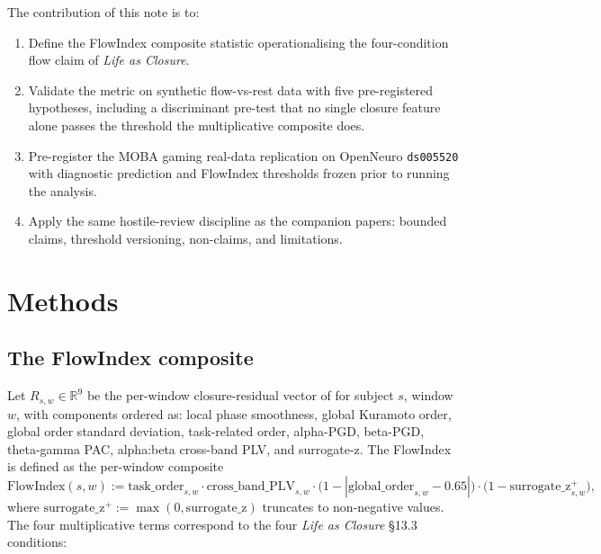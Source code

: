 \documentclass[11pt,a4paper]{article}
\begin{document}
\bigskip
\noindent{}
\bigskip

The contribution of this note is to:
\begin{enumerate}\itemsep0pt
\item Define the FlowIndex composite statistic operationalising the four-condition flow claim of \emph{Life as Closure}.
\item Validate the metric on synthetic flow-vs-rest data with five pre-registered hypotheses, including a discriminant pre-test that no single closure feature alone passes the threshold the multiplicative composite does.
\item Pre-register the MOBA gaming real-data replication on OpenNeuro \texttt{ds005520} with diagnostic prediction and FlowIndex thresholds frozen prior to running the analysis.
\item Apply the same hostile-review discipline as the companion papers: bounded claims, threshold versioning, non-claims, and limitations.
\end{enumerate}

\section{Methods}\label{sec:methods}

\subsection{The FlowIndex composite}\label{sec:methods-flowindex}

Let $R_{s,w} \in \mathbb{R}^9$ be the per-window closure-residual vector of \citep{SolutionLab002} for subject $s$, window $w$, with components ordered as: local phase smoothness, global Kuramoto order, global order standard deviation, task-related order, alpha-PGD, beta-PGD, theta-gamma PAC, alpha:beta cross-band PLV, and surrogate-z. The FlowIndex is defined as the per-window composite
\[
  \mathrm{FlowIndex}(s,w) := \mathrm{task\_order}_{s,w} \cdot \mathrm{cross\_band\_PLV}_{s,w} \cdot \big(1 - |\mathrm{global\_order}_{s,w} - 0.65|\big) \cdot \big(1 - \mathrm{surrogate\_z}_{s,w}^+\big),
\]
where $\mathrm{surrogate\_z}^+ := \max(0, \mathrm{surrogate\_z})$ truncates to non-negative values. The four multiplicative terms correspond to the four \emph{Life as Closure} \S 13.3 conditions:
\end{document}
